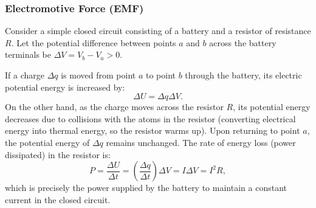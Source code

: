 \subsubsection{Electromotive Force (EMF)}

Consider a simple closed circuit consisting of a battery and a resistor of resistance $R$. Let the potential difference between points $a$ and $b$ across the battery terminals be $\Delta V = V_b - V_a > 0$.

\begin{center}
\end{center}

If a charge $\Delta q$ is moved from point $a$ to point $b$ through the battery, its electric potential energy is increased by:
\begin{equation}
    \Delta U = \Delta q \Delta V.
\end{equation}
On the other hand, as the charge moves across the resistor $R$, its potential energy decreases due to collisions with the atoms in the resistor (converting electrical energy into thermal energy, so the resistor warms up). Upon returning to point $a$, the potential energy of $\Delta q$ remains unchanged. The rate of energy loss (power dissipated) in the resistor is:
\begin{equation}
    P = \frac{\Delta U}{\Delta t} = \left( \frac{\Delta q}{\Delta t} \right) \Delta V = I \Delta V = I^2 R,
\end{equation}
which is precisely the power supplied by the battery to maintain a constant current in the closed circuit.

